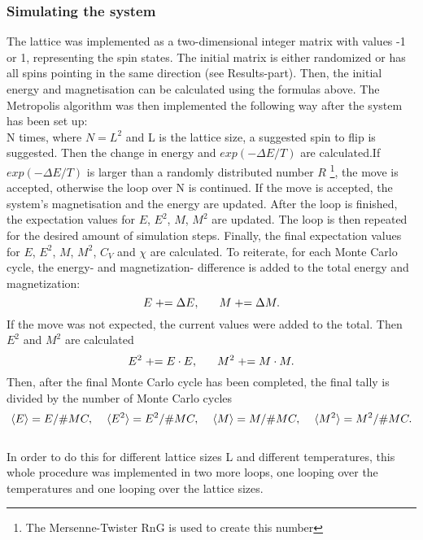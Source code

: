 \documentclass[10pt,a4paper]{article}
\begin{document}
\subsubsection{Simulating the system}
The lattice was implemented as a two-dimensional integer matrix with values -1 or 1, representing the spin states. The initial matrix is either randomized or has all spins pointing in the same direction (see Results-part). 
Then, the initial energy and magnetisation can be calculated using the formulas above.
The Metropolis algorithm was then implemented the following way after the system has been set up:\\
N times, where $N=L^2$ and L is the lattice size, a suggested spin to flip is suggested. Then the change in energy and $exp(-\Delta E/T)$ are calculated.If $exp(-\Delta E/T)$ is larger than a randomly distributed number $R$ \footnote{The Mersenne-Twister RnG is used to create this number}, the move is accepted, otherwise the loop over N is continued. If the move is accepted, the system's magnetisation and the energy are updated. After the loop is finished, the expectation values for $E$, $E^2$, $M$, $M^2$ are updated. The loop is then repeated for the desired amount of simulation steps. Finally, the final expectation values for $E$, $E^2$, $M$, $M^2$, $C_V$ and $\chi$ are calculated. To reiterate, for each Monte Carlo cycle, the energy- and magnetization- difference is added to the total energy and magnetization:
\begin{equation*}
E \mathrel{{+}{=}} \Delta E,\hspace{6mm} M\mathrel{{+}{=}} \Delta M.
\end{equation*}
If the move was not expected, the current values were added to the total.
Then $E^2$ and $M^2$ are calculated
\begin{equation*}
E^2 \mathrel{{+}{=}}E\cdot E,\hspace{6mm} M^2 \mathrel{{+}{=}} M\cdot M.
\end{equation*}
Then, after the final Monte Carlo cycle has been completed, the final tally is divided by the number of Monte Carlo cycles
\begin{equation*}
\braket{E} = E/\#MC,\hspace{4mm}\braket{E^2} =E^2/\#MC,\hspace{4mm}\braket{M} = M/\#MC,\hspace{4mm}\braket{M^2} =M^2/\#MC.
\end{equation*}\\
In order to do this for different lattice sizes L and different temperatures, this whole procedure was implemented in two more loops, one looping over the temperatures and one looping over the lattice sizes.
\end{document}
